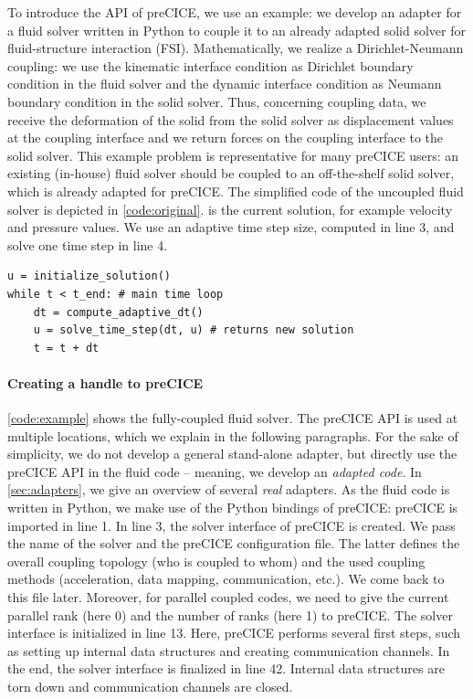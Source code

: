 To introduce the API of preCICE, we use an example: we develop an adapter for a fluid solver written in Python to couple it to an already adapted solid solver for fluid-structure interaction (FSI). Mathematically, we realize a Dirichlet-Neumann coupling: we use the kinematic interface condition as Dirichlet boundary condition in the fluid solver and the dynamic interface condition as Neumann boundary condition in the solid solver. 
Thus, concerning coupling data, we receive the deformation of the solid from the solid solver as displacement values at the coupling interface and we return forces on the coupling interface to the solid solver. 
This example problem is representative for many preCICE users: an existing (in-house) fluid solver should be coupled to an off-the-shelf solid solver, which is already adapted for preCICE. 
The simplified code of the uncoupled fluid solver is depicted in \autoref{code:original}.  is the current solution, for example velocity and pressure values. We use an adaptive time step size, computed in line 3, and solve one time step in line 4.

\begin{listing}[h!]
\caption{Original uncoupled fluid solver in Python}
\small
\label{code:original}
\begin{verbatim}
u = initialize_solution()
while t < t_end: # main time loop
    dt = compute_adaptive_dt() 
    u = solve_time_step(dt, u) # returns new solution
    t = t + dt    
\end{verbatim}
\end{listing}


\paragraph{Creating a handle to preCICE} \autoref{code:example} shows the fully-coupled fluid solver. The preCICE API is used at multiple locations, which we explain in the following paragraphs. For the sake of simplicity, we do not develop a general stand-alone adapter, but directly use the preCICE API in the fluid code -- meaning, we develop an \textit{adapted code}. In \autoref{sec:adapters}, we give an overview of several \textit{real} adapters. As the fluid code is written in Python, we make use of the Python bindings of preCICE: preCICE is imported in line 1. In line 3, the solver interface of preCICE is created. We pass the name of the solver and the preCICE configuration file. The latter defines the overall coupling topology (who is coupled to whom) and the used coupling methods (acceleration, data mapping, communication, etc.). We come back to this file later. Moreover, for parallel coupled codes, we need to give the current parallel rank (here 0) and the number of ranks (here 1) to preCICE.
The solver interface is initialized in line 13. Here, preCICE performs several first steps, such as setting up internal data structures and creating communication channels. In the end, the solver interface is finalized in line 42. Internal data structures are torn down and communication channels are closed.


